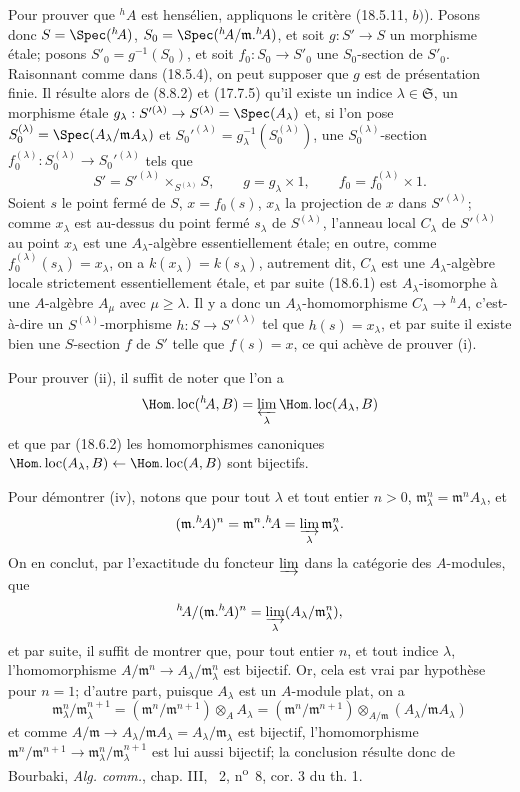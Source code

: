 Pour prouver que ${}^h\!A$ est hensélien, appliquons le critère (18.5.11, $b)$). Posons donc $S=\Spec({}^h\!A)$, $S_0=\Spec({}^h\!A/\mathfrak m.{}^h\!A)$, et soit $g:S'\to S$ un morphisme étale; posons $S'_0=g^{-1}(S_0)$, et soit $f_0:S_0\to S'_0$ une $S_0$-section de $S'_0$. Raisonnant comme dans (18.5.4), on peut supposer que $g$ est de présentation finie. Il résulte alors de (8.8.2) et (17.7.5) qu'il existe un indice $\lambda\in\mathfrak S$, un morphisme étale $g_\lambda:S'^{(\lambda)}\to S^{(\lambda)}=\Spec(A_\lambda)$ et, si l'on pose $S_0^{(\lambda)}=\Spec(A_\lambda/\mathfrak mA_\lambda)$ et $S_0'^{(\lambda)}=g_\lambda^{-1}(S_0^{(\lambda)})$, une $S_0^{(\lambda)}$-section $f_0^{(\lambda)}:S_0^{(\lambda)}\to S_0'^{(\lambda)}$ tels que
\[
  S'=S'^{(\lambda)}\times_{S^{(\lambda)}}S,\qquad
  g=g_\lambda\times1,\qquad
  f_0=f_0^{(\lambda)}\times1.
\]
Soient $s$ le point fermé de $S$, $x=f_0(s)$, $x_\lambda$ la projection de $x$ dans $S'^{(\lambda)}$; comme $x_\lambda$ est au-dessus du point fermé $s_\lambda$ de $S^{(\lambda)}$, l'anneau local $C_\lambda$ de $S'^{(\lambda)}$ au point $x_\lambda$ est une $A_\lambda$-algèbre essentiellement étale; en outre, comme $f_0^{(\lambda)}(s_\lambda)=x_\lambda$, on a $k(x_\lambda)=k(s_\lambda)$, autrement dit, $C_\lambda$ est une $A_\lambda$-algèbre locale strictement essentiellement étale, et par suite (18.6.1) est $A_\lambda$-isomorphe à une $A$-algèbre $A_\mu$ avec $\mu\geq\lambda$. Il y a donc un $A_\lambda$-homomorphisme $C_\lambda\to{}^h\!A$, c'est-à-dire un $S^{(\lambda)}$-morphisme $h:S\to S'^{(\lambda)}$ tel que $h(s)=x_\lambda$, et par suite il existe bien une $S$-section $f$ de $S'$ telle que $f(s)=x$, ce qui achève de prouver (i).

Pour prouver (ii), il suffit de noter que l'on a
\[
  \Hom.\operatorname{loc}({}^h\!A,B)=\varprojlim_\lambda\Hom.\operatorname{loc}(A_\lambda,B)
\]
et que par (18.6.2) les homomorphismes canoniques $\Hom.\operatorname{loc}(A_\lambda,B)\leftarrow\Hom.\operatorname{loc}(A,B)$ sont bijectifs.

Pour démontrer (iv), notons que pour tout $\lambda$ et tout entier $n>0$, $\mathfrak m_\lambda^n=\mathfrak m^nA_\lambda$, et
\[
  (\mathfrak m.{}^h\!A)^n=\mathfrak m^n.{}^h\!A=\varinjlim_\lambda\mathfrak m_\lambda^n.
\]
On en conclut, par l'exactitude du foncteur $\varinjlim$ dans la catégorie des $A$-modules, que
\[
  {}^h\!A/(\mathfrak m.{}^h\!A)^n=\varinjlim_\lambda(A_\lambda/\mathfrak m_\lambda^n),
\]
et par suite, il suffit de montrer que, pour tout entier $n$, et tout indice $\lambda$, l'homomorphisme $A/\mathfrak m^n\to A_\lambda/\mathfrak m_\lambda^n$ est bijectif. Or, cela est vrai par hypothèse pour $n=1$; d'autre part, puisque $A_\lambda$ est un $A$-module plat, on a
\[
  \mathfrak m_\lambda^n/\mathfrak m_\lambda^{n+1}
  =(\mathfrak m^n/\mathfrak m^{n+1})\otimes_A A_\lambda
  =(\mathfrak m^n/\mathfrak m^{n+1})\otimes_{A/\mathfrak m}(A_\lambda/\mathfrak mA_\lambda)
\]
et comme $A/\mathfrak m\to A_\lambda/\mathfrak mA_\lambda=A_\lambda/\mathfrak m_\lambda$ est bijectif, l'homomorphisme $\mathfrak m^n/\mathfrak m^{n+1}\to\mathfrak m_\lambda^n/\mathfrak m_\lambda^{n+1}$ est lui aussi bijectif; la conclusion résulte donc de Bourbaki, \emph{Alg. comm.}, chap. III, \textsection~2, n\textsuperscript{o}~8, cor. 3 du th. 1.

